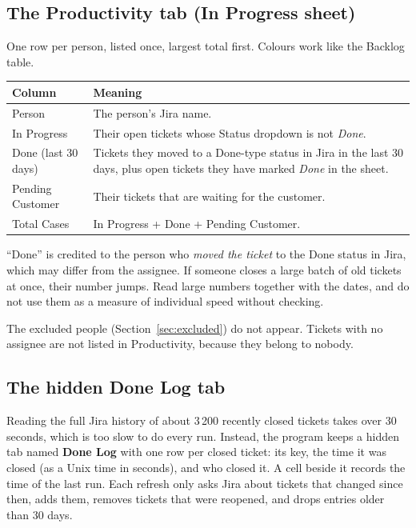 \documentclass[11pt,a4paper]{article}
\newcommand{\tab}[1]{\textbf{#1}}
\let\oldsubsection\subsection
\renewcommand{\subsection}{\needspace{7\baselineskip}\oldsubsection}
\begin{document}
\subsection{The Productivity tab (In Progress sheet)}
\label{sec:ipprod}
One row per person, listed once, largest total first. Colours work like the Backlog table.

\begin{tabularx}{\linewidth}{@{}l L@{}}
\toprule
\textbf{Column} & \textbf{Meaning} \\
\midrule
Person & The person's Jira name. \\
In Progress & Their open tickets whose Status dropdown is not \emph{Done}. \\
Done (last 30 days) & Tickets they moved to a Done-type status in Jira in the last 30 days, plus open tickets they
have marked \emph{Done} in the sheet. \\
Pending Customer & Their tickets that are waiting for the customer. \\
Total Cases & In Progress + Done + Pending Customer. \\
\bottomrule
\end{tabularx}

\begin{warning}
``Done'' is credited to the person who \emph{moved the ticket} to the Done status in Jira, which may differ from the
assignee. If someone closes a large batch of old tickets at once, their number jumps. Read large numbers together with
the dates, and do not use them as a measure of individual speed without checking.
\end{warning}
The excluded people (Section~\ref{sec:excluded}) do not appear. Tickets with no assignee are not listed in Productivity, because they
belong to nobody.

\subsection{The hidden Done Log tab}
\label{sec:donelog}
Reading the full Jira history of about 3\,200 recently closed tickets takes over 30 seconds, which is too slow to do
every run. Instead, the program keeps a hidden tab named \tab{Done Log} with one row per closed ticket: its key, the
time it was closed (as a Unix time in seconds), and who closed it. A cell beside it records the time of the last run.
Each refresh only asks Jira about tickets that changed since then, adds them, removes tickets that were reopened, and
drops entries older than 30 days.
\end{document}
